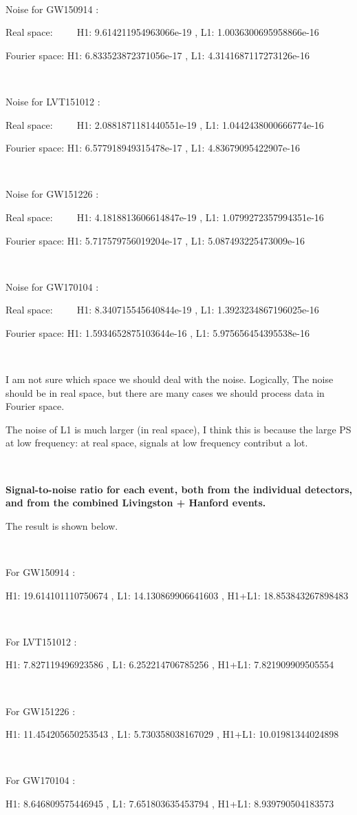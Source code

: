 \documentclass[showpacs, oneside, onecolumn, prl, amsmath, amssymb, nofootinbib, superscriptaddress, notitlepage]{revtex4-1}
\begin{document}
{\color{gray}
~~~~

Noise for  GW150914 :

Real space:~~~~~H1: 9.614211954963066e-19 , L1: 1.0036300695958866e-16

Fourier space:	H1: 6.833523872371056e-17 , L1: 4.3141687117273126e-16

~~~~

Noise for  LVT151012 :

Real space:~~~~~H1: 2.0881871181440551e-19 , L1: 1.0442438000666774e-16

Fourier space:	H1: 6.577918949315478e-17 , L1: 4.83679095422907e-16

~~~~

Noise for  GW151226 :

Real space:~~~~~H1: 4.1818813606614847e-19 , L1: 1.0799272357994351e-16

Fourier space:	H1: 5.717579756019204e-17 , L1: 5.087493225473009e-16

~~~~

Noise for  GW170104 :

Real space:~~~~~H1: 8.340715545640844e-19 , L1: 1.3923234867196025e-16

Fourier space:	H1: 1.5934652875103644e-16 , L1: 5.975656454395538e-16

~~~~
}

I am not sure which space we should deal with the noise. Logically, The noise should be in real space, but there are many cases we should process data in Fourier space.

The noise of L1 is much larger (in real space), I think this is because the large PS at low frequency: at real space, signals at low frequency contribut a lot.

~~~~

\textbf{Signal-to-noise ratio for each event, both from the individual detectors, and from the combined Livingston + Hanford events.}

The result is shown below.

{\color{gray}
~~~~

For  GW150914 :

H1: 19.614101110750674 , L1: 14.130869906641603 , H1+L1: 18.853843267898483

~~~~

For  LVT151012 :

H1: 7.827119496923586 , L1: 6.252214706785256 , H1+L1: 7.821909909505554

~~~~

For  GW151226 :

H1: 11.454205650253543 , L1: 5.730358038167029 , H1+L1: 10.01981344024898

~~~~

For  GW170104 :

H1: 8.646809575446945 , L1: 7.651803635453794 , H1+L1: 8.939790504183573

~~~~
}
\end{document}
